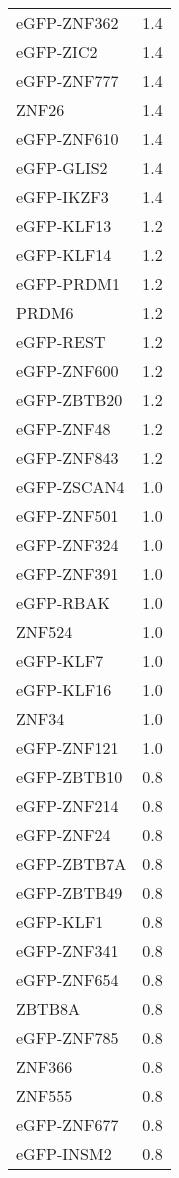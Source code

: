 \begin{longtable}{lr}
  eGFP-ZNF362 &    1.4 \\
    eGFP-ZIC2 &    1.4 \\
  eGFP-ZNF777 &    1.4 \\
        ZNF26 &    1.4 \\
  eGFP-ZNF610 &    1.4 \\
   eGFP-GLIS2 &    1.4 \\
   eGFP-IKZF3 &    1.4 \\
   eGFP-KLF13 &    1.2 \\
   eGFP-KLF14 &    1.2 \\
   eGFP-PRDM1 &    1.2 \\
        PRDM6 &    1.2 \\
    eGFP-REST &    1.2 \\
  eGFP-ZNF600 &    1.2 \\
  eGFP-ZBTB20 &    1.2 \\
   eGFP-ZNF48 &    1.2 \\
  eGFP-ZNF843 &    1.2 \\
  eGFP-ZSCAN4 &    1.0 \\
  eGFP-ZNF501 &    1.0 \\
  eGFP-ZNF324 &    1.0 \\
  eGFP-ZNF391 &    1.0 \\
    eGFP-RBAK &    1.0 \\
       ZNF524 &    1.0 \\
    eGFP-KLF7 &    1.0 \\
   eGFP-KLF16 &    1.0 \\
        ZNF34 &    1.0 \\
  eGFP-ZNF121 &    1.0 \\
  eGFP-ZBTB10 &    0.8 \\
  eGFP-ZNF214 &    0.8 \\
   eGFP-ZNF24 &    0.8 \\
  eGFP-ZBTB7A &    0.8 \\
  eGFP-ZBTB49 &    0.8 \\
    eGFP-KLF1 &    0.8 \\
  eGFP-ZNF341 &    0.8 \\
  eGFP-ZNF654 &    0.8 \\
       ZBTB8A &    0.8 \\
  eGFP-ZNF785 &    0.8 \\
       ZNF366 &    0.8 \\
       ZNF555 &    0.8 \\
  eGFP-ZNF677 &    0.8 \\
   eGFP-INSM2 &    0.8 \\

\end{longtable}
